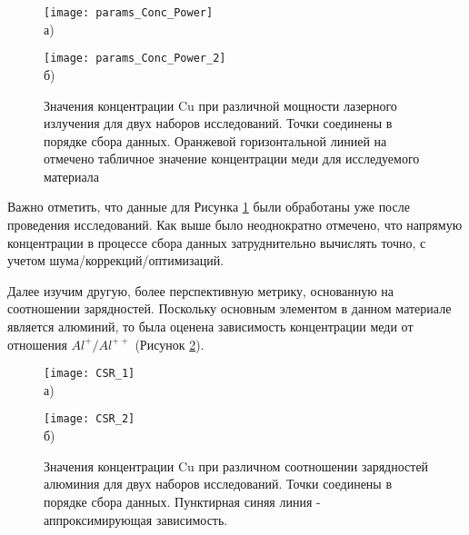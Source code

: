 \begin{figure}[htb]
	\begin{minipage}[b]{0.49\textwidth}\centering
		\texttt{[image: params\_Conc\_Power]} \\ а)
	\end{minipage}
	\begin{minipage}[b]{0.49\textwidth}\centering
		\texttt{[image: params\_Conc\_Power\_2]} \\ б)
	\end{minipage}
	\caption{Значения концентрации Cu при различной мощности лазерного излучения для двух наборов исследований. Точки соединены в порядке сбора данных. Оранжевой горизонтальной линией на отмечено табличное значение концентрации меди для исследуемого материала}
	\label{fig:params_Conc_Power}
\end{figure}

\FloatBarrier

Важно отметить, что данные для Рисунка \cref{fig:params_Conc_Power} были обработаны уже после проведения исследований. Как выше было неоднократно отмечено, что напрямую концентрации в процессе сбора данных затруднительно вычислять точно, с учетом шума/коррекций/оптимизаций.

Далее изучим другую, более перспективную метрику, основанную на соотношении зарядностей. Поскольку основным элементом в данном материале является алюминий, то была оценена зависимость концентрации меди от отношения $Al^{+}/Al^{++}$ (Рисунок \cref{fig:params_Conc_CSR}).

\begin{figure}[htb]
	\begin{minipage}[b]{0.49\textwidth}\centering
		\texttt{[image: CSR\_1]} \\ а)
	\end{minipage}
	\begin{minipage}[b]{0.49\textwidth}\centering
		\texttt{[image: CSR\_2]} \\ б)
	\end{minipage}
	\caption{Значения концентрации Cu при различном соотношении зарядностей алюминия для двух наборов исследований. Точки соединены в порядке сбора данных. Пунктирная синяя линия - аппроксимирующая зависимость.}
	\label{fig:params_Conc_CSR}
\end{figure}

